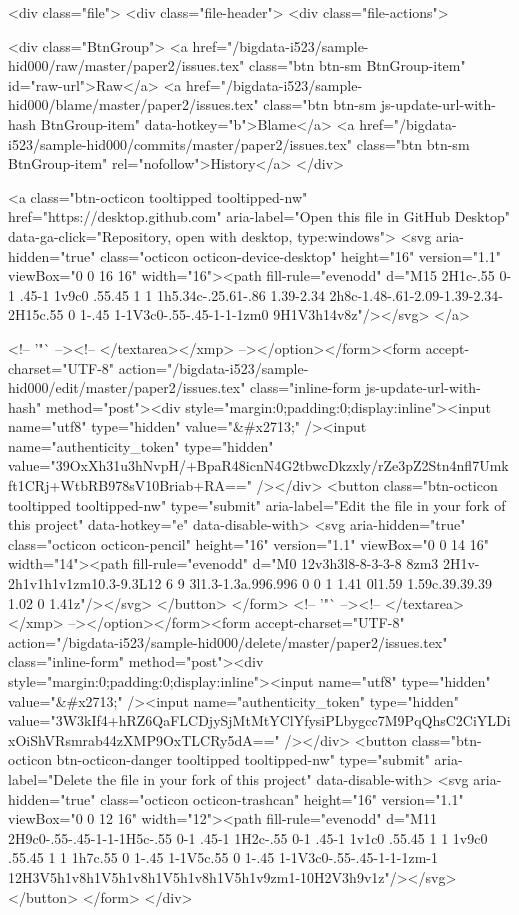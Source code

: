   <div class="file">
    <div class="file-header">
  <div class="file-actions">

    <div class="BtnGroup">
      <a href="/bigdata-i523/sample-hid000/raw/master/paper2/issues.tex" class="btn btn-sm BtnGroup-item" id="raw-url">Raw</a>
        <a href="/bigdata-i523/sample-hid000/blame/master/paper2/issues.tex" class="btn btn-sm js-update-url-with-hash BtnGroup-item" data-hotkey="b">Blame</a>
      <a href="/bigdata-i523/sample-hid000/commits/master/paper2/issues.tex" class="btn btn-sm BtnGroup-item" rel="nofollow">History</a>
    </div>

        <a class="btn-octicon tooltipped tooltipped-nw"
           href="https://desktop.github.com"
           aria-label="Open this file in GitHub Desktop"
           data-ga-click="Repository, open with desktop, type:windows">
            <svg aria-hidden="true" class="octicon octicon-device-desktop" height="16" version="1.1" viewBox="0 0 16 16" width="16"><path fill-rule="evenodd" d="M15 2H1c-.55 0-1 .45-1 1v9c0 .55.45 1 1 1h5.34c-.25.61-.86 1.39-2.34 2h8c-1.48-.61-2.09-1.39-2.34-2H15c.55 0 1-.45 1-1V3c0-.55-.45-1-1-1zm0 9H1V3h14v8z"/></svg>
        </a>

        <!-- '"` --><!-- </textarea></xmp> --></option></form><form accept-charset="UTF-8" action="/bigdata-i523/sample-hid000/edit/master/paper2/issues.tex" class="inline-form js-update-url-with-hash" method="post"><div style="margin:0;padding:0;display:inline"><input name="utf8" type="hidden" value="&#x2713;" /><input name="authenticity_token" type="hidden" value="39OxXh31u3hNvpH/+BpaR48icnN4G2tbwcDkzxly/rZe3pZ2Stn4nfl7Umkft1CRj+WtbRB978sV10Briab+RA==" /></div>
          <button class="btn-octicon tooltipped tooltipped-nw" type="submit"
            aria-label="Edit the file in your fork of this project" data-hotkey="e" data-disable-with>
            <svg aria-hidden="true" class="octicon octicon-pencil" height="16" version="1.1" viewBox="0 0 14 16" width="14"><path fill-rule="evenodd" d="M0 12v3h3l8-8-3-3-8 8zm3 2H1v-2h1v1h1v1zm10.3-9.3L12 6 9 3l1.3-1.3a.996.996 0 0 1 1.41 0l1.59 1.59c.39.39.39 1.02 0 1.41z"/></svg>
          </button>
</form>        <!-- '"` --><!-- </textarea></xmp> --></option></form><form accept-charset="UTF-8" action="/bigdata-i523/sample-hid000/delete/master/paper2/issues.tex" class="inline-form" method="post"><div style="margin:0;padding:0;display:inline"><input name="utf8" type="hidden" value="&#x2713;" /><input name="authenticity_token" type="hidden" value="3W3kIf4+hRZ6QaFLCDjySjMtMtYClYfysiPLbygcc7M9PqQhsC2CiYLDixOiShVRsmrab44zXMP9OxTLCRy5dA==" /></div>
          <button class="btn-octicon btn-octicon-danger tooltipped tooltipped-nw" type="submit"
            aria-label="Delete the file in your fork of this project" data-disable-with>
            <svg aria-hidden="true" class="octicon octicon-trashcan" height="16" version="1.1" viewBox="0 0 12 16" width="12"><path fill-rule="evenodd" d="M11 2H9c0-.55-.45-1-1-1H5c-.55 0-1 .45-1 1H2c-.55 0-1 .45-1 1v1c0 .55.45 1 1 1v9c0 .55.45 1 1 1h7c.55 0 1-.45 1-1V5c.55 0 1-.45 1-1V3c0-.55-.45-1-1-1zm-1 12H3V5h1v8h1V5h1v8h1V5h1v8h1V5h1v9zm1-10H2V3h9v1z"/></svg>
          </button>
</form>  </div>

